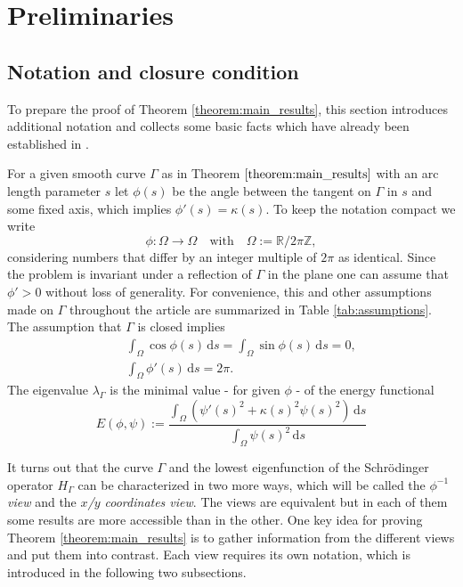 \documentclass{article}
\newcommand{\ds}{\,\mathrm{d}s}
\newcommand{\R}{\mathbb{R}\xspace}
\begin{document}
\section{Preliminaries} \label{sec:Preliminaries}

\subsection{Notation and closure condition}
To prepare the proof of Theorem \ref{theorem:main_results}, this section introduces additional notation and collects some basic facts which have already been established in \cite{Linde:ALowerBound}.

For a given smooth curve $\Gamma$ as in Theorem $\ref{theorem:main_results}$ with an arc length parameter $s$ let $\phi(s)$ be the angle between the tangent on $\Gamma$ in $s$ and some fixed axis, which implies $\phi'(s) = \kappa(s)$. To keep the notation compact we write
$$\phi: \Omega \rightarrow \Omega \quad \mathrm{with}\quad\Omega := \R \slash 2\pi \mathbb Z,$$
considering numbers that differ by an integer multiple of $2\pi$ as identical.
Since the problem is invariant under a reflection of $\Gamma$ in the plane one can assume that $\phi' > 0$ without loss of generality.
For convenience, this and other assumptions made on $\Gamma$ throughout the article are summarized in Table \ref{tab:assumptions}.
The assumption that $\Gamma$ is closed implies
\begin{eqnarray} \label{eq:closure_condition}
&&\int_\Omega \cos \phi(s) \ds =  \int_\Omega \sin \phi(s) \ds = 0,\\
&&\int_\Omega \phi'(s) \ds = 2\pi.\nonumber
\end{eqnarray}
The eigenvalue $\lambda_\Gamma$ is the minimal value - for given $\phi$ - of the energy functional 
\begin{equation}
    E(\phi,\psi) := \frac{\int_\Omega (\psi'(s)^2 + \kappa(s)^2\psi(s)^2)\ds}{\int_\Omega\psi(s)^2\ds}
\end{equation}

It turns out that the curve $\Gamma$ and the lowest eigenfunction of the Schrö\-din\-ger operator $H_\Gamma$ can be characterized in two more ways, which will be called the \emph{$\phi^{-1}$ view} and the \emph{$x$/$y$ coordinates view}. The views are equivalent but in each of them some results are more accessible than in the other. One key idea for proving Theorem \ref{theorem:main_results} is to gather information from the different views and put them into contrast. Each view requires its own notation, which is introduced in the following two subsections.
\end{document}

